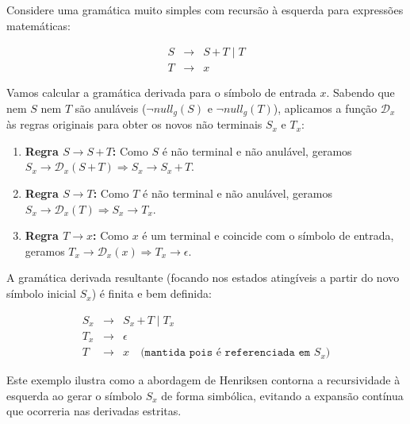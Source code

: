 Considere uma gramática muito simples com recursão à esquerda para expressões matemáticas:

\[
\begin{array}{lcl}
S & \to & S \, \texttt{+} \, T \;|\; T \\
T & \to & x
\end{array}
\]

Vamos calcular a gramática derivada para o símbolo de entrada $x$. Sabendo que nem $S$ nem $T$ são anuláveis ($\neg null_g(S)$ e $\neg null_g(T)$), aplicamos a função $\mathcal{D}_x$ às regras originais para obter os novos não terminais $S_x$ e $T_x$:

\begin{enumerate}
    \item \textbf{Regra $S \to S \, \texttt{+} \, T$:} Como $S$ é não terminal e não anulável, geramos $S_x \to \mathcal{D}_x(S \, \texttt{+} \, T) \Rightarrow S_x \to S_x \, \texttt{+} \, T$.
    \item \textbf{Regra $S \to T$:} Como $T$ é não terminal e não anulável, geramos $S_x \to \mathcal{D}_x(T) \Rightarrow S_x \to T_x$.
    \item \textbf{Regra $T \to x$:} Como $x$ é um terminal e coincide com o símbolo de entrada, geramos $T_x \to \mathcal{D}_x(x) \Rightarrow T_x \to \epsilon$.
\end{enumerate}

A gramática derivada resultante (focando nos estados atingíveis a partir do novo símbolo inicial $S_x$) é finita e bem definida:

\[
\begin{array}{lcl}
S_x & \to & S_x \, \texttt{+} \, T \;|\; T_x \\
T_x & \to & \epsilon \\
T & \to & x \quad \texttt{(mantida pois é referenciada em } S_x \texttt{)}
\end{array}
\]

Este exemplo ilustra como a abordagem de Henriksen contorna a recursividade à esquerda ao gerar o símbolo $S_x$ de forma simbólica, evitando a expansão contínua que ocorreria nas derivadas estritas.
